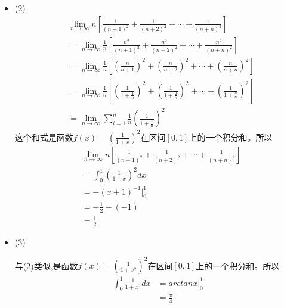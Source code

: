 \documentclass{article}
\begin{document}
\begin{itemize}
  \item (2)
        \begin{align*}
           & \lim \limits_{n \to \infty} n \left[ \frac{1}{(n + 1)^2} + \frac{1}{(n+2)^2} + \cdots + \frac{1}{(n+n)^2} \right]                  \\
           & = \lim \limits_{n \to \infty} \frac{1}{n}\left[ \frac{n^2}{(n + 1)^2} + \frac{n^2}{(n+2)^2} + \cdots + \frac{n^2}{(n+n)^2} \right] \\
           & = \lim \limits_{n \to \infty} \frac{1}{n}\left[ \left(\frac{n}{n + 1}\right)^2 + \left(\frac{n}{n+2}\right)^2
          + \cdots + \left(\frac{n}{n+n}\right)^2 \right]                                                                                       \\
           & = \lim \limits_{n \to \infty} \frac{1}{n}\left[ \left(\frac{1}{1 + \frac{1}{n}}\right)^2 + \left(\frac{1}{1+\frac{2}{n}}\right)^2
          + \cdots + \left(\frac{1}{1+\frac{n}{n}}\right)^2 \right]                                                                             \\
           & =\lim \limits_{n \to \infty} \sum \limits_{i=1}^n \frac{1}{n} \left(\frac{1}{1+\frac{i}{n}}\right)^2
        \end{align*}
        这个和式是函数$f(x) = \left(\frac{1}{1 + x}\right)^2$在区间$[0, 1]$上的一个积分和。所以
        \begin{align*}
           & \lim \limits_{n \to \infty} n \left[ \frac{1}{(n + 1)^2} + \frac{1}{(n+2)^2} + \cdots + \frac{1}{(n+n)^2} \right] \\
           & = \int_{0}^{1} \left(\frac{1}{1 + x}\right)^2 dx                                                                  \\
           & = - (x+1)^{-1} \bigg|_0^1                                                                                         \\
           & = - \frac{1}{2} - (-1)                                                                                            \\
           & = \frac{1}{2}
        \end{align*}

  \item (3)

        与(2)类似,是函数$f(x) = \left(\frac{1}{1 + x^2}\right)^2$在区间$[0, 1]$上的一个积分和。所以
        \begin{align*}
          \int_{0}^{1} \frac{1}{1 + x^2} dx
           & = arc tan x \bigg|_0^1 \\
           & = \frac{\pi}{4}
        \end{align*}


\end{itemize}
\end{document}
